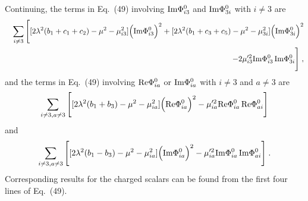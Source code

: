 \documentclass[12pt]{article}
\begin{document}
Continuing, the terms in  Eq.~(49) involving ${\rm Im}\Phi^0_{i3}$ and ${\rm Im}\Phi^0_{3i}$ with $i\neq 3$ are
\begin{eqnarray}
 &&\sum_{i\neq 3}\Bigg[[2\lambda^2(b_1+c_1+c_2)-\mu^2-\mu_{i3}^2]\Big({\rm Im}\Phi^0_{i3}\Big)^2+
 [2\lambda^2(b_1+c_3+c_5)-\mu^2-\mu_{3i}^2]\Big({\rm Im}\Phi^0_{3i}\Big)^2\nonumber\\&&~~~
-2\mu'^2_{i3}{\rm Im}\Phi^0_{i3}\,{\rm Im}\Phi^0_{3i}\Bigg]\;,
\end{eqnarray}
and the terms in Eq.~(49) involving ${\rm Re}\Phi^0_{ia}$ or ${\rm Im}\Phi^0_{ia}$ with $i\neq 3$ and $a\neq 3$ are
\begin{equation}
\sum_{i\neq 3,a\neq 3}\Bigg[[2\lambda^2(b_1+b_3)-\mu^2-\mu^2_{ia}]\Big({\rm Re}\Phi_{ia}^0\Big)^2-\mu'^2_{ia}{\rm Re}\Phi^0_{ia}\,{\rm Re}\Phi^0_{ai}\Bigg]
\end{equation}
and 
\begin{equation}
\sum_{i\neq 3,a\neq 3}\Bigg[[2\lambda^2(b_1-b_3)-\mu^2-\mu^2_{ia}]\Big({\rm Im}\Phi_{ia}^0\Big)^2-\mu'^2_{ia}{\rm Im}\Phi^0_{ia}\,{\rm Im}\Phi^0_{ai}\Bigg]\;.
\end{equation}
Corresponding results for the charged scalars can be found from the first four lines of Eq.~(49).
\end{document}

